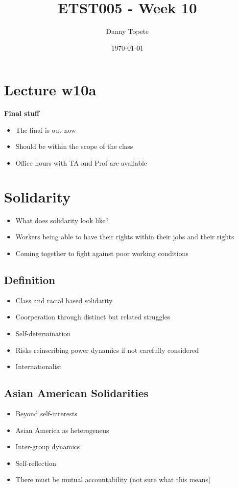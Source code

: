 \documentclass{article}
\title{ETST005 - Week 10}
\author{Danny Topete}
\date{\today}
\begin{document}
\maketitle

\section*{Lecture w10a}

\textbf{Final stuff}
\begin{itemize}
  \item The final is out now
  \item Should be within the scope of the class
  \item Office hours with TA and Prof are available
\end{itemize}

\section{Solidarity}
\begin{itemize}
  \item What does solidarity look like?
  \item Workers being able to have their rights within their jobs and their rights
  \item Coming together to fight against poor working conditions
\end{itemize}

\subsection{Definition}
\begin{itemize}
  \item Class and racial based solidarity
  \item Coorperation through distinct but related struggles
  \item Self-determination
  \item Risks reinscribing power dynamics if not carefully considered
  \item Internationalist
\end{itemize}

\subsection{Asian American Solidarities}
\begin{itemize}
  \item Beyond self-interests
  \item Asian America as heterogeneus
  \item Inter-group dynamics
  \item Self-reflection
  \item There must be mutual accountability (not sure what this means)
\end{itemize}
\end{document}
